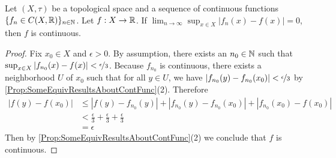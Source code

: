 \documentclass[screen,single]{techreport}
\numberwithin{equation}{section}
\begin{document}
\begin{lemma}\label{Lem:UniformContinuous}
	Let $(X,\tau)$ be a topological space and a sequence of continuous functions $\{f_n \in C(X,\mathbb{R})\}_{n \in \mathbb{N}}$.
	Let $f : X \to \mathbb{R}$.
	If $\lim_{n \to \infty} \sup_{x \in X} |f_n(x) - f(x)| = 0$, then $f$ is continuous.
\end{lemma}
\begin{proof}
	Fix $x_0 \in X$ and $\epsilon > 0$.
	By assumption, there exists an $n_0 \in \mathbb{N}$ such that $\sup_{x \in X} |f_{n_0}(x) - f(x)| < \nicefrac{\epsilon}{3}$.
	Because $f_{n_0}$ is continuous, there exists a neighborhood $U$ of $x_0$ such that for all $y \in U$, we have $|f_{n_0}(y) - f_{n_0}(x_0)| < \nicefrac{\epsilon}{3}$ by \cref{Prop:SomeEquivResultsAboutContFunc}(2).
	Therefore
	\begin{align*}
		|f(y) - f(x_0)| & \le |f(y) - f_{n_0}(y)| + |f_{n_0}(y) - f_{n_0}(x_0)| + |f_{n_0}(x_0) - f(x_0)| \\
		& < \frac{\epsilon}{3} + \frac{\epsilon}{3} + \frac{\epsilon}{3} \\
		& = \epsilon
	\end{align*}
	Then by \cref{Prop:SomeEquivResultsAboutContFunc}(2) we conclude that $f$ is continuous.
\end{proof}
\end{document}
